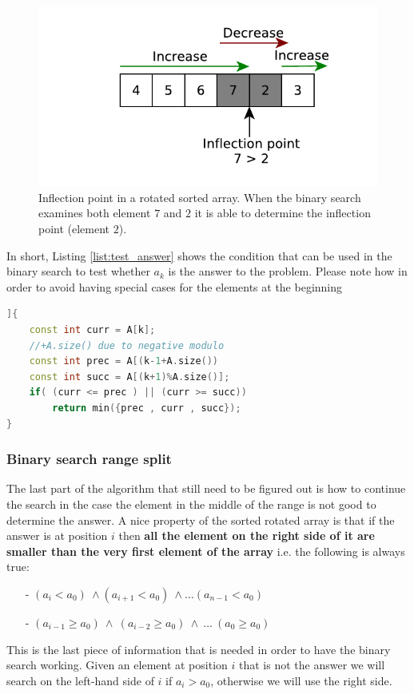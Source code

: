 \begin{figure}
	\label{fig:min_rotated_array:test_element}
	\centering
	\includegraphics[scale=1.0]{sources/min_rotated_array/images/inflection_point}
	\caption{Inflection point in a rotated sorted array. When the binary search examines both element $7$ and $2$ it is able to determine the inflection point (element $2$). }
\end{figure}

In short, Listing \ref{list:test_answer} shows the condition that can be used in the binary search to test whether $a_k$ is the answer to the problem. Please note how in order to avoid having special cases for the elements at the beginning 

\begin{lstlisting}[language=c++, caption={Test to verify whether the binary search can stop because an answer has been found.},label=list:test_answer]]{
	const int curr = A[k];
	//+A.size() due to negative modulo
	const int prec = A[(k-1+A.size())
	const int succ = A[(k+1)%A.size()];
	if( (curr <= prec ) || (curr >= succ))
		return min({prec , curr , succ});
}
\end{lstlisting}

\subsubsection{Binary search range split}
The last part of the algorithm that still need to be figured out is how to continue the search in the case the element in the middle of the range is not good to determine the answer. A nice property of the sorted rotated array is that if the answer is at position $i$ then \textbf{all the element on the right side of it are smaller than the very first element of the array} i.e. the following is always true:
\begin{itemize}
	\item[-] $	(a_i < a_0) \: \wedge (a_{i+1} < a_0) \: \wedge \ldots (a_{n-1} < a_0) $
	\item[-] $	(a_{i-1} \geq a_0) \: \wedge \: (a_{i-2} \geq a_0) \: \wedge \: \ldots \: (a_{0} \geq a_0) $
\end{itemize}
This is the last piece of information that is needed in order to have the binary search working. Given an element at position $i$ that is not the answer we  will search on the left-hand side of $i$ if $a_i > a_0$, otherwise we will use the right side.



